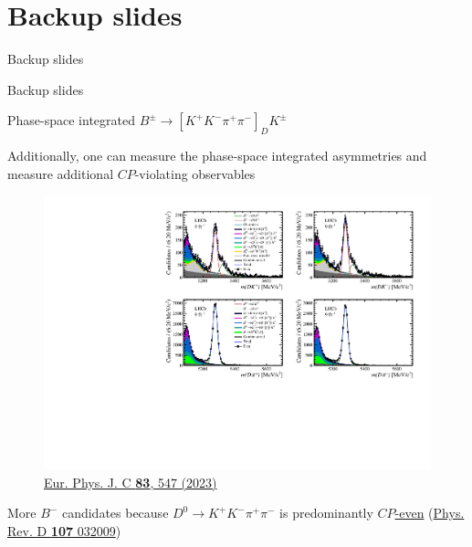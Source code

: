 \documentclass[dvipsnames]{beamer}
\begin{document}
\section{Backup slides}
\begin{frame}{Backup slides}
  \begin{center}
    {\huge Backup slides}
  \end{center}
\end{frame}

\begin{frame}{Phase-space integrated $B^\pm\to[K^+K^-\pi^+\pi^-]_DK^\pm$}
  \begin{center}
    {\large Additionally, one can measure the phase-space integrated asymmetries and measure additional $C\!P$-violating observables}
  \end{center}
  \begin{figure}
    \centering
    \includegraphics[width = 1.0\textwidth,trim={0 7cm 0 0},clip=true]{Plots/d2kkpipi_fiveL_allDP_GLW.pdf}
    \vspace{-0.6cm}
    \caption*{\tiny\href{https://link.springer.com/article/10.1140/epjc/s10052-023-11560-5}{Eur. Phys. J. C \textbf{83}, 547 (2023)}}
  \end{figure}
  \vspace{-0.4cm}
  \begin{center}
    {\large More $B^-$ candidates because $D^0\to K^+K^-\pi^+\pi^-$ is predominantly \underline{$C\!P$-even} (\href{https://journals.aps.org/prd/abstract/10.1103/PhysRevD.107.032009}{Phys. Rev. D \textbf{107} 032009})}
  \end{center}
\end{frame}
\end{document}
